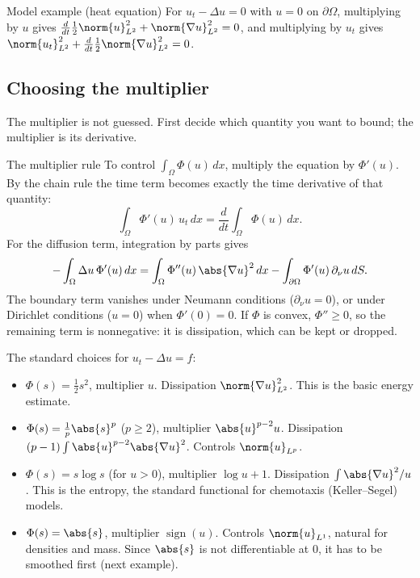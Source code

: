 \begin{exbox}{Model example (heat equation)}
For $u_t-\Delta u=0$ with $u=0$ on $\partial\Omega$, multiplying by $u$ gives $\frac{d}{dt}\frac12\norm{u}_{L^2}^2+\norm{\nabla u}_{L^2}^2=0$, and multiplying by $u_t$ gives $\norm{u_t}_{L^2}^2+\frac{d}{dt}\frac12\norm{\nabla u}_{L^2}^2=0$.
\end{exbox}

\subsection*{Choosing the multiplier}

The multiplier is not guessed. First decide which quantity you want to bound; the multiplier is its derivative.

\begin{thmbox}{The multiplier rule}
To control $\int_\Omega \Phi(u)\,dx$, multiply the equation by $\Phi'(u)$. By the chain rule the time term becomes exactly the time derivative of that quantity:
\[
\int_\Omega \Phi'(u)\,u_t\,dx=\frac{d}{dt}\int_\Omega \Phi(u)\,dx.
\]
For the diffusion term, integration by parts gives
\[
-\int_\Omega \Delta u\,\Phi'(u)\,dx=\int_\Omega \Phi''(u)\,\abs{\nabla u}^2\,dx-\int_{\partial\Omega}\Phi'(u)\,\partial_\nu u\,dS .
\]
The boundary term vanishes under Neumann conditions ($\partial_\nu u=0$), or under Dirichlet conditions ($u=0$) when $\Phi'(0)=0$. If $\Phi$ is convex, $\Phi''\ge 0$, so the remaining term is nonnegative: it is dissipation, which can be kept or dropped.
\end{thmbox}

The standard choices for $u_t-\Delta u=f$:
\begin{itemize}
\item $\Phi(s)=\frac12 s^2$, multiplier $u$. Dissipation $\norm{\nabla u}_{L^2}^2$. This is the basic energy estimate.
\item $\Phi(s)=\frac1p\abs{s}^p$ ($p\ge 2$), multiplier $\abs{u}^{p-2}u$. Dissipation $(p-1)\int\abs{u}^{p-2}\abs{\nabla u}^2$. Controls $\norm{u}_{L^p}$.
\item $\Phi(s)=s\log s$ (for $u>0$), multiplier $\log u+1$. Dissipation $\int \abs{\nabla u}^2/u$. This is the entropy, the standard functional for chemotaxis (Keller--Segel) models.
\item $\Phi(s)=\abs{s}$, multiplier $\operatorname{sign}(u)$. Controls $\norm{u}_{L^1}$, natural for densities and mass. Since $\abs{s}$ is not differentiable at $0$, it has to be smoothed first (next example).
\end{itemize}

